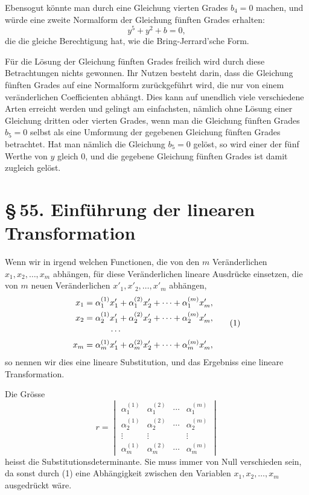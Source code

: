 \documentclass[11pt]{article}
\providecommand{\sect}[2]{\section*{\S\,#1. #2}}
\begin{document}
Ebensogut könnte man durch eine Gleichung vierten Grades $b_4=0$ machen, und würde eine zweite Normalform der Gleichung fünften Grades erhalten:
\begin{equation}
y^5+y^2+b=0,
\tag{7}
\end{equation}
die die gleiche Berechtigung hat, wie die Bring-Jerrard'sche Form.

Für die Lösung der Gleichung fünften Grades freilich wird durch diese Betrachtungen nichts gewonnen. Ihr Nutzen besteht darin, dass die Gleichung fünften Grades auf eine Normalform zurückgeführt wird, die nur von einem veränderlichen Coefficienten abhängt. Dies kann auf unendlich viele verschiedene Arten erreicht werden und gelingt am einfachsten, nämlich ohne Lösung einer Gleichung dritten oder vierten Grades, wenn man die Gleichung fünften Grades $b_5=0$ selbst als eine Umformung der gegebenen Gleichung fünften Grades betrachtet. Hat man nämlich die Gleichung $b_5=0$ gelöst, so wird einer der fünf Werthe von $y$ gleich $0$, und die gegebene Gleichung fünften Grades ist damit zugleich gelöst.

\sect{55}{Einführung der linearen Transformation}

Wenn wir in irgend welchen Functionen, die von den $m$ Veränderlichen $x_1,x_2,\ldots,x_m$ abhängen, für diese Veränderlichen lineare Ausdrücke einsetzen, die von $m$ neuen Veränderlichen $x'_1,x'_2,\ldots,x'_m$ abhängen,
\begin{equation}
\begin{aligned}
 x_1&=\alpha_1^{(1)}x'_1+\alpha_1^{(2)}x'_2+\cdots+\alpha_1^{(m)}x'_m,\\
 x_2&=\alpha_2^{(1)}x'_1+\alpha_2^{(2)}x'_2+\cdots+\alpha_2^{(m)}x'_m,\\
 &\hspace{3.0em}\cdots\\
 x_m&=\alpha_m^{(1)}x'_1+\alpha_m^{(2)}x'_2+\cdots+\alpha_m^{(m)}x'_m,
\end{aligned}
\tag{1}
\end{equation}
so nennen wir dies eine lineare Substitution, und das Ergebniss eine lineare Transformation.

Die Grösse
\begin{equation}
 r=\begin{vmatrix}
 \alpha_1^{(1)}&\alpha_1^{(2)}&\cdots&\alpha_1^{(m)}\\
 \alpha_2^{(1)}&\alpha_2^{(2)}&\cdots&\alpha_2^{(m)}\\
 \vdots&\vdots&&\vdots\\
 \alpha_m^{(1)}&\alpha_m^{(2)}&\cdots&\alpha_m^{(m)}
 \end{vmatrix}
\tag{2}
\end{equation}
heisst die Substitutionsdeterminante. Sie muss immer von Null verschieden sein, da sonst durch (1) eine Abhängigkeit zwischen den Variablen $x_1,x_2,\ldots,x_m$ ausgedrückt wäre.
\end{document}

